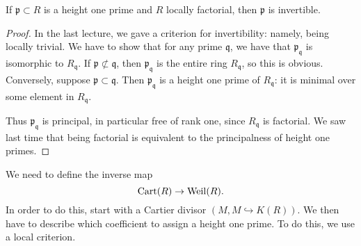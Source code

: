 \begin{proposition} 
If $\mathfrak{p} \subset R$ is a height one prime and $R$ locally factorial, then $\mathfrak{p}$ is
invertible. 
\end{proposition} 
\begin{proof} 
In the last lecture, we gave a criterion for invertibility: namely, being
locally trivial. We have to show that for any prime $\mathfrak{q}$, we have
that $\mathfrak{p}_{\mathfrak{q}}$ is isomorphic to $R_{\mathfrak{q}}$. If
$\mathfrak{p} \not\subset \mathfrak{q}$, then $\mathfrak{p}_{\mathfrak{q}}$ is
the entire ring $R_{\mathfrak{q}}$, so this is obvious. Conversely, suppose
$\mathfrak{p} \subset {\mathfrak{q}}$. Then $\mathfrak{p}_{\mathfrak{q}}$ is
a height one prime of $R_{\mathfrak{q}}$: it is minimal over some element in
$R_{\mathfrak{q}}$. 

Thus $\mathfrak{p}_{\mathfrak{q}}$ is principal, in particular free of rank
one, since $R_{\mathfrak{q}}$ is factorial. We saw last time that being
factorial is equivalent to the principalness of height one primes. 
\end{proof} 

We need to define the inverse map
\[ \operatorname{Cart}(R) \to \operatorname{Weil}(R).  \]
In order to do this, start with a Cartier divisor $(M, M \hookrightarrow
K(R))$. We then have to describe which coefficient to assign a height one
prime. To do this, we use a local criterion. 

